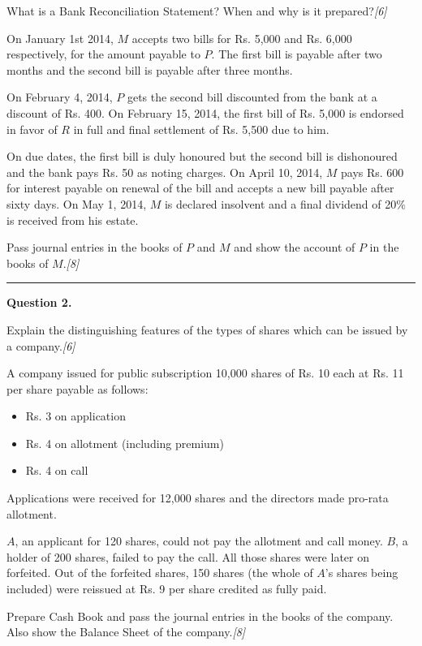 \documentclass[11pt,a4paper]{article}
\newcommand{\pts}[1]{\hfill   \textit{[#1]}}
\begin{document}
\begin{parts}
  \item What is a Bank Reconciliation Statement? When and why is it prepared?\pts{6}
  \item On January 1st 2014, $M$ accepts two bills for Rs. 5,000 and Rs. 6,000 respectively, for the amount payable to $P$. The first bill is payable after two months and the second bill is payable after three months.
  
  On February 4, 2014, $P$ gets the second bill discounted from the bank at a discount of Rs. 400. On February 15, 2014, the first bill of Rs. 5,000 is endorsed in favor of $R$ in full and final settlement of Rs. 5,500 due to him.
  
  On due dates, the first bill is duly honoured but the second bill is dishonoured and the bank pays Rs. 50 as noting charges. On April 10, 2014, $M$ pays Rs. 600 for interest payable on renewal of the bill and accepts a new bill payable after sixty days. On May 1, 2014, $M$ is declared insolvent and a final dividend of 20\% is received from his estate.
  
  Pass journal entries in the books of $P$ and $M$ and show the account of $P$ in the books of $M$.\pts{8}
\end{parts}

\medskip\rule{\linewidth}{0.2pt}


\newpage




\noindent   \textbf{Question 2.}

\begin{parts}
  \item Explain the distinguishing features of the types of shares which can be issued by a company.\pts{6}
  \item A company issued for public subscription 10,000 shares of Rs. 10 each at Rs. 11 per share payable as follows:
  
\begin{itemize}[label=-,leftmargin=1.5cm]
    \item Rs. 3 on application
    \item Rs. 4 on allotment (including premium)
    \item Rs. 4 on call
  \end{itemize}
  Applications were received for 12,000 shares and the directors made pro-rata allotment. 
  
  $A$, an applicant for 120 shares, could not pay the allotment and call money. $B$, a holder of 200 shares, failed to pay the call. All those shares were later on forfeited. Out of the forfeited shares, 150 shares (the whole of $A$'s shares being included) were reissued at Rs. 9 per share credited as fully paid.
  
  Prepare Cash Book and pass the journal entries in the books of the company. Also show the Balance Sheet of the company.\pts{8}
\end{parts}
\end{document}
